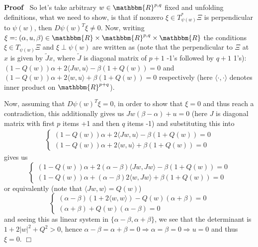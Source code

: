 \documentclass{article}
\newenvironment{proof}{\noindent\textbf{Proof\ }}{\hspace*{\fill}$\Box$\medskip}
\numberwithin{definition}{section}
\numberwithin{lemma}{section}
\numberwithin{proposition}{section}
{\theorembodyfont{\rmfamily}\newtheorem{remark}{Remark}
\numberwithin{remark}{section}
}
\begin{document}
\begin{proof}
  So let's take arbitrary $w \in \mathbbm{R}^{p, q}$ fixed and unfolding
  definitions, what we need to show, is that if nonzero $\xi \in T_{\psi (
  w)}^{\ast} \Xi$ is perpendicular to $\psi ( w)$, then $D \psi ( w)^T \xi
  \neq 0$. Now, writing $\xi = : ( \alpha, u, \beta) \in \mathbbm{R} \times
  \mathbbm{R}^{p, q} \times \mathbbm{R}$ the conditions $\xi \in T_{\psi ( w)}
  \Xi$ and $\xi \perp \psi ( w)$ are written as (note that the perpendicular
  to $\Xi$ at $x$ is given by $\tilde{J} x$, where $\tilde{J}$ is diagonal
  matrix of $p + 1$ -1's followed by $q + 1$ 1's): $( 1 - Q ( w)) \alpha + 2
  \langle J w, u \rangle - \beta ( 1 + Q ( w)) = 0$ and $( 1 - Q ( w)) \alpha
  + 2 \langle w, u \rangle + \beta ( 1 + Q ( w)) = 0$ respectively (here
  $\langle \cdot, \cdot \rangle$ denotes inner product on $\mathbbm{R}^{p +
  q}$).
  
  Now, assuming that $D \psi ( w)^T \xi = 0$, in order to show that $\xi = 0$
  and thus reach a contradiction, this additionally gives us $J w ( \beta -
  \alpha) + u = 0$ (here $J$ is diagonal matrix with first $p$ items +1 and
  then $q$ items -1) and substituting this into
  \begin{eqnarray}
    & \left\{ \begin{array}{l}
      ( 1 - Q ( w)) \alpha + 2 \langle J w, u \rangle - \beta ( 1 + Q ( w)) =
      0\\
      ( 1 - Q ( w)) \alpha + 2 \langle w, u \rangle + \beta ( 1 + Q ( w)) = 0
    \end{array} \right. &  \nonumber
  \end{eqnarray}
  gives us
  \[ \left\{ \begin{array}{l}
       ( 1 - Q ( w)) \alpha + 2 ( \alpha - \beta) \langle J w, J w \rangle -
       \beta ( 1 + Q ( w)) = 0\\
       ( 1 - Q ( w)) \alpha + ( \alpha - \beta) 2 \langle w, J w \rangle +
       \beta ( 1 + Q ( w)) = 0
     \end{array} \right. \]
  or equivalently (note that $\langle J w, w \rangle = Q ( w)$)
  \[ \left\{ \begin{array}{l}
       ( \alpha - \beta) ( 1 + 2 \langle w, w \rangle) - Q ( w) ( \alpha +
       \beta) = 0\\
       ( \alpha + \beta) + Q ( w) ( \alpha - \beta) = 0
     \end{array} \right. \]
  and seeing this as linear system in $\{ \alpha - \beta, \alpha + \beta \}$,
  we see that the determinant is $1 + 2 | w |^2 + Q^2 > 0$, hence $\alpha -
  \beta = \alpha + \beta = 0 \Rightarrow \alpha = \beta = 0 \Rightarrow u = 0$
  and thus $\xi = 0$.
\end{proof}
\end{document}
